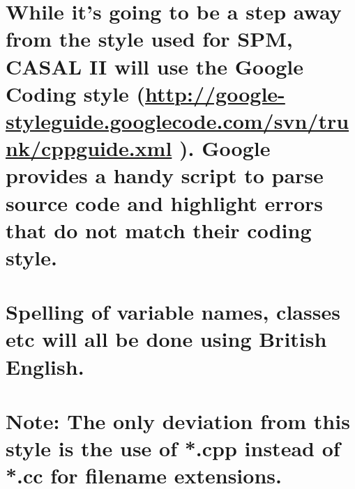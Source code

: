 \documentclass[a4paper,11pt,twoside,pdftex,draft]{article}
\begin{document}
\hypertarget{while-its-going-to-be-a-step-away-from-the-style-used-for-spm-casal-ii-will-use-the-google-coding-style-httpgoogle-styleguide.googlecode.comsvntrunkcppguide.xml-.-google-provides-a-handy-script-to-parse-source-code-and-highlight-errors-that-do-not-match-their-coding-style.}{%
\section{\texorpdfstring{While it's going to be a step away from the
style used for SPM, CASAL II will use the Google Coding style
(\url{http://google-styleguide.googlecode.com/svn/trunk/cppguide.xml} ).
Google provides a handy script to parse source code and highlight errors
that do not match their coding
style.}{While it's going to be a step away from the style used for SPM, CASAL II will use the Google Coding style (http://google-styleguide.googlecode.com/svn/trunk/cppguide.xml ). Google provides a handy script to parse source code and highlight errors that do not match their coding style.}}\label{while-its-going-to-be-a-step-away-from-the-style-used-for-spm-casal-ii-will-use-the-google-coding-style-httpgoogle-styleguide.googlecode.comsvntrunkcppguide.xml-.-google-provides-a-handy-script-to-parse-source-code-and-highlight-errors-that-do-not-match-their-coding-style.}}

\hypertarget{section-6}{%
\section{}\label{section-6}}

\hypertarget{spelling-of-variable-names-classes-etc-will-all-be-done-using-british-english.}{%
\section{\texorpdfstring{Spelling of variable names, classes etc will
all be done using British English.
}{Spelling of variable names, classes etc will all be done using British English. }}\label{spelling-of-variable-names-classes-etc-will-all-be-done-using-british-english.}}

\hypertarget{section-7}{%
\section{}\label{section-7}}

\hypertarget{note-the-only-deviation-from-this-style-is-the-use-of-.cpp-instead-of-.cc-for-filename-extensions.}{%
\section{Note: The only deviation from this style is the use of *.cpp
instead of *.cc for filename
extensions.}\label{note-the-only-deviation-from-this-style-is-the-use-of-.cpp-instead-of-.cc-for-filename-extensions.}}
\end{document}
